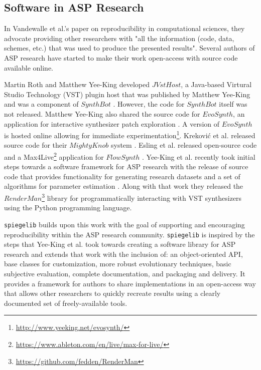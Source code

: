 \subsection{Software in ASP Research}
 In Vandewalle et al.'s paper on reproducibility in computational sciences, they advocate providing other researchers with "all the information (code, data, schemes, etc.) that was used to produce the presented results"\cite{vandewalle2009reproducible}. Several authors of ASP research have started to make their work open-access with source code available online. 
 
 Martin Roth and Matthew Yee-King developed $JVstHost$, a Java-based Virtural Studio Technology (VST) plugin host that was published by Matthew Yee-King \cite{yee2011automatic} and was a component of $SynthBot$ \cite{yee2008synthbot}. However, the code for $SynthBot$ itself was not released. Matthew Yee-King also shared the source code for $EvoSynth$, an application for interactive synthesizer patch exploration \cite{yee2016use}. A version of $EvoSynth$ is hosted online allowing for immediate experimentation\footnote{\url{http://www.yeeking.net/evosynth/}}. Krekovi{\'c} et al. released source code for their $MightyKnob$ system \cite{krekovic2016algorithm}. Esling et al. released open-source code and a Max4Live\footnote{\url{https://www.ableton.com/en/live/max-for-live/}} application for $FlowSynth$ \cite{esling2020flow}. Yee-King et al. recently took initial steps towards a software framework for ASP research with the release of source code that provides functionality for generating research datasets and a set of algorithms for parameter estimation \cite{yee2018automatic}. Along with that work they released the $RenderMan$\footnote{\url{https://github.com/fedden/RenderMan}} library for programmatically interacting with VST synthesizers using the Python programming language.
 
 \texttt{spiegelib} builds upon this work with the goal of supporting and encouraging reproducibility within the ASP research community. \texttt{spiegelib} is inspired by the steps that Yee-King et al. took towards creating a software library for ASP research and extends that work with the inclusion of: an object-oriented API, base classes for customization, more robust evolutionary techniques, basic subjective evaluation, complete documentation, and packaging and delivery. It provides a framework for authors to share implementations in an open-access way that allows other researchers to quickly recreate results using a clearly documented set of freely-available tools.
 

